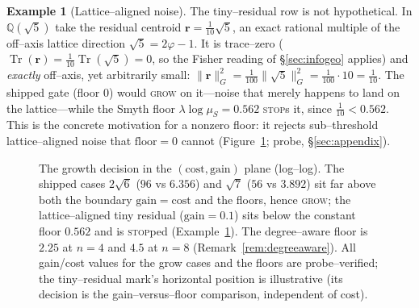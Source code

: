 \documentclass[11pt]{article}
\theoremstyle{plain}
\theoremstyle{definition}
\newtheorem{example}[theorem]{Example}
\theoremstyle{remark}
\newcommand{\Q}{\mathbb{Q}}
\newcommand{\Tr}{\operatorname{Tr}}
\newcommand{\Mah}{\mathrm{M}}
\newcommand{\rr}{\mathbf{r}}
\newcommand{\GG}{G}
\begin{document}
\begin{example}[Lattice--aligned noise]\label{ex:noise}
The tiny--residual row is not hypothetical. In $\Q(\sqrt5)$ take the residual centroid $\rr=\tfrac1{10}\sqrt5$,
an exact rational multiple of the off--axis lattice direction $\sqrt5=2\varphi-1$. It is trace--zero
($\Tr(\rr)=\tfrac1{10}\Tr(\sqrt5)=0$, so the Fisher reading of \S\ref{sec:infogeo} applies) and \emph{exactly}
off--axis, yet arbitrarily small:
$\lVert\rr\rVert_{\GG}^2=\tfrac1{100}\lVert\sqrt5\rVert_{\GG}^2=\tfrac1{100}\cdot 10=\tfrac1{10}$. The shipped
gate (floor $0$) would \textsc{grow} on it---noise that merely happens to land on the lattice---while the Smyth
floor $\lambda\log\mu_S=0.562$ \textsc{stop}s it, since $\tfrac1{10}<0.562$. This is the concrete motivation
for a nonzero floor: it rejects sub--threshold lattice--aligned noise that $\mathrm{floor}=0$ cannot
(Figure~\ref{fig:threshold}; probe, \S\ref{sec:appendix}).
\end{example}

\begin{figure}[ht]
\centering
{}
\caption{The growth decision in the $(\text{cost},\text{gain})$ plane (log--log). The shipped cases $2\sqrt6$
($96$ vs $6.356$) and $\sqrt7$ ($56$ vs $3.892$) sit far above both the boundary $\mathrm{gain}=\mathrm{cost}$
and the floors, hence \textsc{grow}; the lattice--aligned tiny residual ($\mathrm{gain}=0.1$) sits below the
constant floor $0.562$ and is \textsc{stop}ped (Example~\ref{ex:noise}). The degree--aware floor is $2.25$ at
$n{=}4$ and $4.5$ at $n{=}8$ (Remark~\ref{rem:degreeaware}). All gain/cost values for the grow cases and the
floors are probe--verified; the tiny--residual mark's horizontal position is illustrative (its decision is the
gain--versus--floor comparison, independent of cost).}
\label{fig:threshold}
\end{figure}
\end{document}

